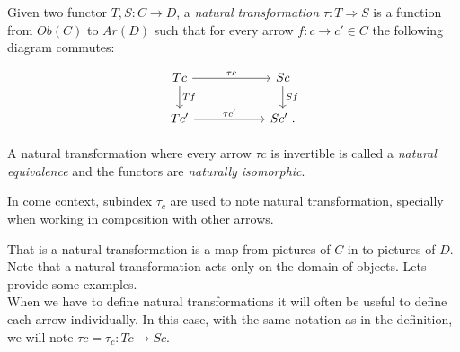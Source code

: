 \begin{definition}
  Given two functor $T,S:C\to D$, a \emph{natural transformation} $\tau : T \Rightarrow S$ is a function from $Ob(C)$ to $Ar(D)$ such that for every arrow $f:c \to c' \in C$ the following diagram commutes:
  \[
    \begin{tikzpicture}
      \node {\begin{tikzcd}[column sep=20mm]
          Tc\ar[r,"\tau c"]\ar[d,"Tf"] & Sc\ar[d,"Sf"]\\
          Tc'\ar[r,"\tau c'"] & Sc'\ .
        \end{tikzcd}};
    \end{tikzpicture}
  \]

 A natural transformation where every arrow $\tau c$ is invertible is called a \emph{natural equivalence} and the functors are \emph{naturally isomorphic}.
\end{definition}
\begin{remark}
  In come context, subindex $\tau_c$ are used to note natural transformation, specially when working in composition with other arrows.
\end{remark}

That is a natural transformation is a map from pictures of $C$ in to pictures of $D$. Note that a natural transformation acts only on the domain of objects. Lets provide some examples.\\

When we have to define natural transformations  it will often be useful to define each arrow individually. In this case, with the same notation as in the definition,  we will note $\tau c = \tau_c: Tc \to Sc$. 

